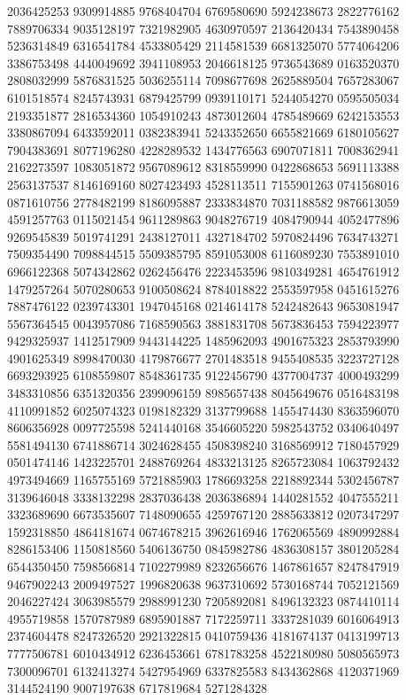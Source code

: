 {{2036425253 9309914885 9768404704 6769580690 5924238673 2822776162 7889706334
9035128197 7321982905 4630970597 2136420434 7543890458 5236314849 6316541784
4533805429 2114581539 6681325070 5774064206 3386753498 4440049692 3941108953
2046618125 9736543689 0163520370 2808032999 5876831525 5036255114 7098677698
2625889504 7657283067 6101518574 8245743931 6879425799 0939110171 5244054270
0595505034 2193351877 2816534360 1054910243 4873012604 4785489669 6242153553
3380867094 6433592011 0382383941 5243352650 6655821669 6180105627 7904383691
8077196280 4228289532 1434776563 6907071811 7008362941 2162273597 1083051872
9567089612 8318559990 0422868653 5691113388 2563137537 8146169160 8027423493
4528113511 7155901263 0741568016 0871610756 2778482199 8186095887 2333834870
7031188582 9876613059 4591257763 0115021454 9611289863 9048276719 4084790944
4052477896 9269545839 5019741291 2438127011 4327184702 5970824496 7634743271
7509354490 7098844515 5509385795 8591053008 6116089230 7553891010 6966122368
5074342862 0262456476 2223453596 9810349281 4654761912 1479257264 5070280653
9100508624 8784018822 2553597958 0451615276 7887476122 0239743301 1947045168
0214614178 5242482643 9653081947 5567364545 0043957086 7168590563 3881831708
5673836453 7594223977 9429325937 1412517909 9443144225 1485962093 4901675323
2853793990 4901625349 8998470030 4179876677 2701483518 9455408535 3223727128
6693293925 6108559807 8548361735 9122456790 4377004737 4000493299 3483310856
6351320356 2399096159 8985657438 8045649676 0516483198 4110991852 6025074323
0198182329 3137799688 1455474430 8363596070 8606356928 0097725598 5241440168
3546605220 5982543752 0340640497 5581494130 6741886714 3024628455 4508398240
3168569912 7180457929 0501474146 1423225701 2488769264 4833213125 8265723084
1063792432 4973494669 1165755169 5721885903 1786693258 2218892344 5302456787
3139646048 3338132298 2837036438 2036386894 1440281552 4047555211 3323689690
6673535607 7148090655 4259767120 2885633812 0207347297 1592318850 4864181674
0674678215 3962616946 1762065569 4890992884 8286153406 1150818560 5406136750
0845982786 4836308157 3801205284 6544350450 7598566814 7102279989 8232656676
1467861657 8247847919 9467902243 2009497527 1996820638 9637310692 5730168744
7052121569 2046227424 3063985579 2988991230 7205892081 8496132323 0874410114
4955719858 1570787989 6895901887 7172259711 3337281039 6016064913 2374604478
8247326520 2921322815 0410759436 4181674137 0413199713 7777506781 6010434912
6236453661 6781783258 4522180980 5080565973 7300096701 6132413274 5427954969
6337825583 8434362868 4120371969 3144524190 9007197638 6717819684 5271284328
}}
